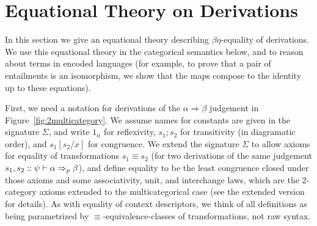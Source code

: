 \documentclass[a4paper,USenglish]{lipics-v2016}
\newcommand\deq{\ensuremath{\equiv}}
\newcommand\spr{\ensuremath{\Rightarrow}} %
\begin{document}

\section{Equational Theory on Derivations}
\label{sec:equational}

In this section we give an equational theory describing $\beta\eta$-equality of
derivations.  We use this equational theory in the categorical semantics
below, and to reason about terms in encoded languages (for example, to
prove that a pair of entailments is an isomorphism, we show that the
maps compose to the identity up to these equations).

First, we need a notation for derivations of the $\alpha \spr \beta$
judgement in Figure~\ref{fig:2multicategory}.  We assume names for
constants are given in the signature $\Sigma$, and write $1_\alpha$ for
reflexivity, $s_1;s_2$ for transitivity (in diagramatic order), and
$s_1[s_2/x]$ for congruence.  We extend the signature $\Sigma$ to allow
axioms for equality of transformations $s_1 \deq s_2$ (for two
derivations of the same judgement $s_1,s_2 ::
\wfsp{\psi}{\alpha}{\beta}{p}$), and define equality to be the least
congruence closed under those axioms and some associativity, unit, and
interchange laws, which are the 2-category axioms extended to the
multicategorical case (see the extended version for details).  As with
equality of context descriptors, we think of all definitions as being
parametrized by \deq-equivalence-classes of transformations, not raw
syntax.
\end{document}
